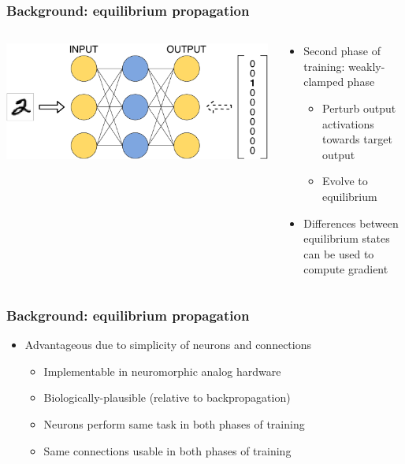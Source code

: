 \documentclass[pdf]{beamer}
\begin{document}
\begin{frame}
\frametitle{Background: equilibrium propagation}
\begin{columns}
	\begin{column}{.5\textwidth}
		\includegraphics[width=\textwidth]{figures/eqp_weakly_clamped.pdf}
	\end{column}
	\begin{column}{.5\textwidth}
		\begin{itemize}
			\item<1-> Second phase of training: weakly-clamped phase
			\begin{itemize}
				\item<2-> Perturb output activations towards target output
				\item<3-> Evolve to equilibrium
			\end{itemize}
			\item<4-> Differences between equilibrium states can be used to compute gradient
		\end{itemize}
	\end{column}
\end{columns}
\end{frame}

\begin{frame}
\frametitle{Background: equilibrium propagation}
\begin{itemize}
	\item<1-> Advantageous due to simplicity of neurons and connections
	\begin{itemize}
		\item<2-> Implementable in neuromorphic analog hardware
		\item<3-> Biologically-plausible (relative to backpropagation)
		\item<4-> Neurons perform same task in both phases of training
		\item<5-> Same connections usable in both phases of training
	\end{itemize}
\end{itemize}
\end{frame}
\end{document}
